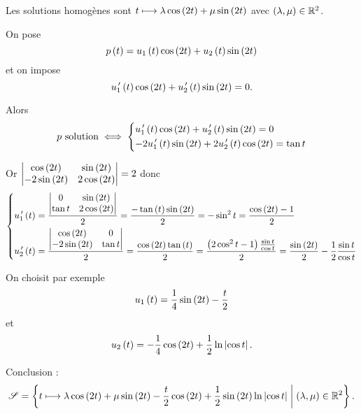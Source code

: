 \begin{corr}
Les solutions homogènes sont \(t\longmapsto\lambda\cos\left(2t\right)+\mu\sin\left(2t\right)\) avec \(\left(\lambda,\mu\right)\in\mathbb{R}^2\).

On pose \[p\left(t\right)=u_1\left(t\right)\cos\left(2t\right)+u_2\left(t\right)\sin\left(2t\right)\] et on impose \[u_1^{\,\prime}\left(t\right)\cos\left(2t\right)+u_2^{\,\prime}\left(t\right)\sin\left(2t\right)=0.\]

Alors \[p\text{ solution}\iff\begin{dcases}
u_1^{\,\prime}\left(t\right)\cos\left(2t\right)+u_2^{\,\prime}\left(t\right)\sin\left(2t\right)=0 \\
-2u_1^{\,\prime}\left(t\right)\sin\left(2t\right)+2u_2^{\,\prime}\left(t\right)\cos\left(2t\right)=\tan t
\end{dcases}\]

Or \(\begin{vmatrix}
\cos\left(2t\right) & \sin\left(2t\right) \\
-2\sin\left(2t\right) & 2\cos\left(2t\right)
\end{vmatrix}=2\) donc \[\begin{dcases}
u_1^{\,\prime}\left(t\right)=\dfrac{\begin{vmatrix}0 & \sin\left(2t\right) \\ \tan t & 2\cos\left(2t\right)\end{vmatrix}}{2}=\dfrac{-\tan\left(t\right)\sin\left(2t\right)}{2}=-\sin^2t=\dfrac{\cos\left(2t\right)-1}{2} \\
u_2^{\,\prime}\left(t\right)=\dfrac{\begin{vmatrix}\cos\left(2t\right) & 0 \\ -2\sin\left(2t\right) & \tan t\end{vmatrix}}{2}=\dfrac{\cos\left(2t\right)\tan\left(t\right)}{2}=\dfrac{\left(2\cos^2t-1\right)\frac{\sin t}{\cos t}}{2}=\dfrac{\sin\left(2t\right)}{2}-\dfrac{1}{2}\dfrac{\sin t}{\cos t}
\end{dcases}\]

On choisit par exemple \[u_1\left(t\right)=\dfrac{1}{4}\sin\left(2t\right)-\dfrac{t}{2}\] et \[u_2\left(t\right)=-\dfrac{1}{4}\cos\left(2t\right)+\dfrac{1}{2}\ln\left\lvert\cos t\right\rvert.\]

Conclusion : \[\mathscr{S}=\left\lbrace t\longmapsto\lambda\cos\left(2t\right)+\mu\sin\left(2t\right)-\dfrac{t}{2}\cos\left(2t\right)+\dfrac{1}{2}\sin\left(2t\right)\ln\left\lvert\cos t\right\rvert\;\middle|\;\left(\lambda,\mu\right)\in\mathbb{R}^2\right\rbrace.\]
\end{corr}
